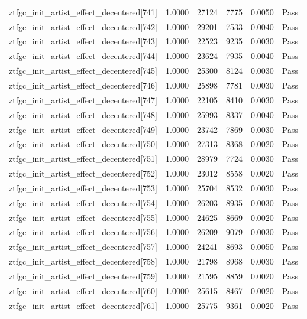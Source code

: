 \begin{table}[htbp]
\begin{tabular}{llrrll}
ztfgc\_init\_artist\_effect\_decentered[741] & 1.0000 & 27124 & 7775 & 0.0050 & Pass \\
ztfgc\_init\_artist\_effect\_decentered[742] & 1.0000 & 29201 & 7533 & 0.0040 & Pass \\
ztfgc\_init\_artist\_effect\_decentered[743] & 1.0000 & 22523 & 9235 & 0.0030 & Pass \\
ztfgc\_init\_artist\_effect\_decentered[744] & 1.0000 & 23624 & 7935 & 0.0040 & Pass \\
ztfgc\_init\_artist\_effect\_decentered[745] & 1.0000 & 25300 & 8124 & 0.0030 & Pass \\
ztfgc\_init\_artist\_effect\_decentered[746] & 1.0000 & 25898 & 7781 & 0.0030 & Pass \\
ztfgc\_init\_artist\_effect\_decentered[747] & 1.0000 & 22105 & 8410 & 0.0030 & Pass \\
ztfgc\_init\_artist\_effect\_decentered[748] & 1.0000 & 25993 & 8337 & 0.0040 & Pass \\
ztfgc\_init\_artist\_effect\_decentered[749] & 1.0000 & 23742 & 7869 & 0.0030 & Pass \\
ztfgc\_init\_artist\_effect\_decentered[750] & 1.0000 & 27313 & 8368 & 0.0020 & Pass \\
ztfgc\_init\_artist\_effect\_decentered[751] & 1.0000 & 28979 & 7724 & 0.0030 & Pass \\
ztfgc\_init\_artist\_effect\_decentered[752] & 1.0000 & 23012 & 8558 & 0.0020 & Pass \\
ztfgc\_init\_artist\_effect\_decentered[753] & 1.0000 & 25704 & 8532 & 0.0030 & Pass \\
ztfgc\_init\_artist\_effect\_decentered[754] & 1.0000 & 26203 & 8935 & 0.0030 & Pass \\
ztfgc\_init\_artist\_effect\_decentered[755] & 1.0000 & 24625 & 8669 & 0.0020 & Pass \\
ztfgc\_init\_artist\_effect\_decentered[756] & 1.0000 & 26209 & 9079 & 0.0030 & Pass \\
ztfgc\_init\_artist\_effect\_decentered[757] & 1.0000 & 24241 & 8693 & 0.0050 & Pass \\
ztfgc\_init\_artist\_effect\_decentered[758] & 1.0000 & 21798 & 8968 & 0.0030 & Pass \\
ztfgc\_init\_artist\_effect\_decentered[759] & 1.0000 & 21595 & 8859 & 0.0020 & Pass \\
ztfgc\_init\_artist\_effect\_decentered[760] & 1.0000 & 25615 & 8467 & 0.0020 & Pass \\
ztfgc\_init\_artist\_effect\_decentered[761] & 1.0000 & 25775 & 9361 & 0.0020 & Pass \\

\end{tabular}
\end{table}

